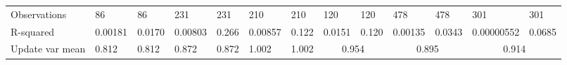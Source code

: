 \begin{tabular}{lllllllcccccc}
      &       &       &       &       &       &       &       &       &       &       &       &  \\
\midrule
Observations & 86    & 86    & 231   & 231   & 210   & 210   & \multicolumn{1}{l}{120} & \multicolumn{1}{l}{120} & \multicolumn{1}{l}{478} & \multicolumn{1}{l}{478} & \multicolumn{1}{l}{301} & \multicolumn{1}{l}{301} \\
R-squared & 0.00181 & 0.0170 & 0.00803 & 0.266 & 0.00857 & 0.122 & \multicolumn{1}{l}{0.0151} & \multicolumn{1}{l}{0.120} & \multicolumn{1}{l}{0.00135} & \multicolumn{1}{l}{0.0343} & \multicolumn{1}{l}{0.00000552} & \multicolumn{1}{l}{0.0685} \\
Update var mean & 0.812 & 0.812 & 0.872 & 0.872 & 1.002 & 1.002 & \multicolumn{2}{c}{0.954} & \multicolumn{2}{c}{0.895} & \multicolumn{2}{c}{0.914} \\
\bottomrule
\bottomrule
\end{tabular}%

